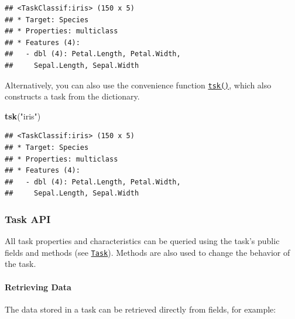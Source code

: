 \documentclass[]{article}
\newenvironment{Shaded}{\begin{snugshade}}{\end{snugshade}}
\newcommand{\KeywordTok}[1]{\textcolor[rgb]{0.13,0.29,0.53}{\textbf{#1}}}
\newcommand{\NormalTok}[1]{#1}
\newcommand{\OperatorTok}[1]{\textcolor[rgb]{0.81,0.36,0.00}{\textbf{#1}}}
\newcommand{\StringTok}[1]{\textcolor[rgb]{0.31,0.60,0.02}{#1}}
\let\oldparagraph\paragraph
\renewcommand{\paragraph}[1]{\oldparagraph{#1}\mbox{}}
\renewenvironment{Shaded} {\begin{snugshade}\small} {\end{snugshade}}
\begin{document}
\begin{Shaded}
\end{Shaded}

\begin{verbatim}
## <TaskClassif:iris> (150 x 5)
## * Target: Species
## * Properties: multiclass
## * Features (4):
##   - dbl (4): Petal.Length, Petal.Width,
##     Sepal.Length, Sepal.Width
\end{verbatim}

Alternatively, you can also use the convenience function \href{https://mlr3.mlr-org.com/reference/mlr_sugar.html}{\texttt{tsk()}}, which also constructs a task from the dictionary.

\begin{Shaded}
\begin{Highlighting}[]
\KeywordTok{tsk}\NormalTok{(}\StringTok{"iris"}\NormalTok{)}
\end{Highlighting}
\end{Shaded}

\begin{verbatim}
## <TaskClassif:iris> (150 x 5)
## * Target: Species
## * Properties: multiclass
## * Features (4):
##   - dbl (4): Petal.Length, Petal.Width,
##     Sepal.Length, Sepal.Width
\end{verbatim}

\hypertarget{tasks-api}{%
\subsubsection{Task API}\label{tasks-api}}

All task properties and characteristics can be queried using the task's public fields and methods (see \href{https://mlr3.mlr-org.com/reference/Task.html}{\texttt{Task}}).
Methods are also used to change the behavior of the task.

\hypertarget{tasks-retrieving}{%
\paragraph{Retrieving Data}\label{tasks-retrieving}}

The data stored in a task can be retrieved directly from fields, for example:
\end{document}
